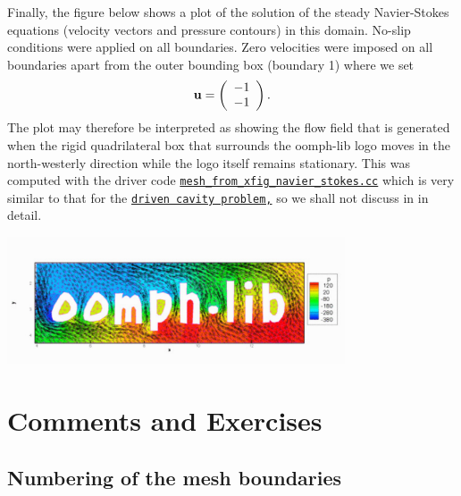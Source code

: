 Finally, the figure below shows a plot of the solution of the steady Navier-\/\+Stokes equations (velocity vectors and pressure contours) in this domain. No-\/slip conditions were applied on all boundaries. Zero velocities were imposed on all boundaries apart from the outer bounding box (boundary 1) where we set \[ {\bf u} = \left( \begin{array}{c} -1 \\ -1 \end{array} \right). \] The plot may therefore be interpreted as showing the flow field that is generated when the rigid quadrilateral box that surrounds the oomph-\/lib logo moves in the north-\/westerly direction while the logo itself remains stationary. This was computed with the driver code \href{../../../../demo_drivers/meshing/mesh_from_xfig_triangle/mesh_from_xfig_navier_stokes.cc}{\tt mesh\+\_\+from\+\_\+xfig\+\_\+navier\+\_\+stokes.\+cc} which is very similar to that for the \href{../../../navier_stokes/driven_cavity/html/index.html}{\tt driven cavity problem,} so we shall not discuss in in detail.

 
\begin{DoxyImage}
\includegraphics[width=0.75\textwidth]{oomph_flow}
\end{DoxyImage}




 

\hypertarget{index_comments}{}\section{Comments and Exercises}\label{index_comments}
\hypertarget{index_bound}{}\subsection{Numbering of the mesh boundaries}\label{index_bound}

